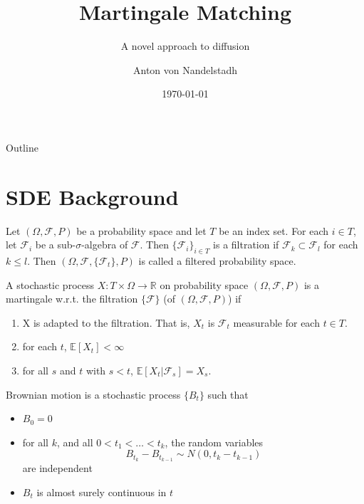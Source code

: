 \documentclass{beamer}
\title{Martingale Matching}
\subtitle{A novel approach to diffusion}
\author{Anton von Nandelstadh}
\institute{Uppsala University}
\date{\today}
\begin{document}
\begin{frame}
\titlepage
\end{frame}

\begin{frame}{Outline}
	\tableofcontents
\end{frame}

\section{SDE Background}
\begin{frame}
\begin{definition}[Filtration]
	Let $(\Omega, \mathcal{F}, P)$ be a probability space and let $T$ be an index set. For each $i \in T$, let $\mathcal{F}_i$ be a sub-$\sigma$-algebra of $\mathcal{F}$. Then $\{\mathcal{F}_i\}_{i \in T}$ is a filtration if $\mathcal{F}_k \subset \mathcal{F}_l$ for each $k \leq l$. Then $(\Omega, \mathcal{F}, \{\mathcal{F}_t\}, P)$ is called a filtered probability space.
\end{definition}
\end{frame}

\begin{frame}
\begin{definition}[Martingale]
	A stochastic process $X:T \times \Omega \to \mathbb{R}$ on probability space $(\Omega, \mathcal{F}, P)$ is a martingale w.r.t. the filtration $\{\mathcal{F}\}$ (of $(\Omega, \mathcal{F}, P)$) if
	\begin{enumerate}
		\item
		X is adapted to the filtration. That is, $X_t$ is $\mathcal{F}_t$ measurable for each $t \in T$.
		\item
			for each $t$, $\mathbb{E}[X_t] < \infty$
		\item
			for all $s$ and $t$ with $s < t$, $\mathbb{E}[X_t|\mathcal{F}_s] = X_s.$
	\end{enumerate}
\end{definition}
\end{frame}

\begin{frame}
	\begin{definition}
		Brownian motion is a stochastic process $\{B_t\}$ such that
		\begin{itemize}
			\item $B_0 = 0$
			\item for all $k$, and all $0 < t_1 < \ldots < t_k$, the random variables \[B_{t_k} - B_{t_{k-1}} \sim N(0, t_k - t_{k-1})\] are independent
			\item $B_t$ is almost surely continuous in $t$
		\end{itemize}
	\end{definition}
\end{frame}
\end{document}
